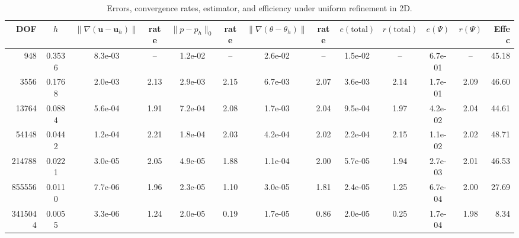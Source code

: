 \documentclass[10pt,a4paper]{article}
\begin{document}
\begin{table}[h!]
\centering
\begin{footnotesize}
\caption{Errors, convergence rates, estimator, and efficiency under uniform refinement in 2D.}
\begin{tabular}{rcccccccccccr}
\toprule
DOF & $h$ & $\|\nabla(\boldsymbol{u}-\boldsymbol{u}_h)\|$ & rate 
& $\|p-p_h\|_{0}$ & rate 
& $\|\nabla(\theta-\theta_h)\|$ & rate
& $e(\text{total})$ & $r(\text{total})$
& $e(\Psi)$ & $r(\Psi)$
& Effec \\
\midrule
948     & 0.3536 & 8.3e-03 & --   & 1.2e-02 & --   & 2.6e-02 & --   & 1.5e-02 & --   & 6.7e-01 & --   & 45.18 \\
3556    & 0.1768 & 2.0e-03 & 2.13 & 2.9e-03 & 2.15 & 6.7e-03 & 2.07 & 3.6e-03 & 2.14 & 1.7e-01 & 2.09 & 46.60 \\
13764   & 0.0884 & 5.6e-04 & 1.91 & 7.2e-04 & 2.08 & 1.7e-03 & 2.04 & 9.5e-04 & 1.97 & 4.2e-02 & 2.04 & 44.61 \\
54148   & 0.0442 & 1.2e-04 & 2.21 & 1.8e-04 & 2.03 & 4.2e-04 & 2.02 & 2.2e-04 & 2.15 & 1.1e-02 & 2.02 & 48.71 \\
214788  & 0.0221 & 3.0e-05 & 2.05 & 4.9e-05 & 1.88 & 1.1e-04 & 2.00 & 5.7e-05 & 1.94 & 2.7e-03 & 2.01 & 46.53 \\
855556  & 0.0110 & 7.7e-06 & 1.96 & 2.3e-05 & 1.10 & 3.0e-05 & 1.81 & 2.4e-05 & 1.25 & 6.7e-04 & 2.00 & 27.69 \\
3415044 & 0.0055 & 3.3e-06 & 1.24 & 2.0e-05 & 0.19 & 1.7e-05 & 0.86 & 2.0e-05 & 0.25 & 1.7e-04 & 1.98 & 8.34 \\
\bottomrule
\end{tabular}
\label{table_2d_conv}
\end{footnotesize}
\end{table}
\end{document}
